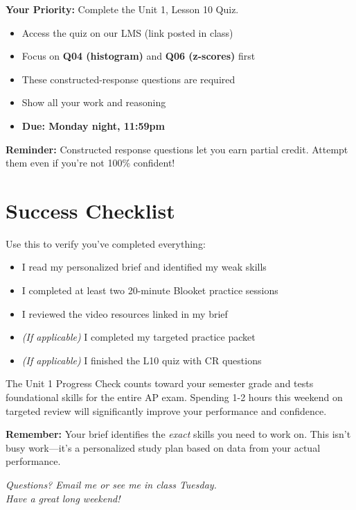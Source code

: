 \documentclass[12pt]{article}
\begin{document}
\begin{tcolorbox}[colback=red!10!white,colframe=red!75!black]
\textbf{Your Priority:} Complete the Unit 1, Lesson 10 Quiz.

\begin{itemize}[leftmargin=*]
    \item Access the quiz on our LMS (link posted in class)
    \item Focus on \textbf{Q04 (histogram)} and \textbf{Q06 (z-scores)} first
    \item These constructed-response questions are required
    \item Show all your work and reasoning
    \item \textbf{Due: Monday night, 11:59pm}
\end{itemize}

\textbf{Reminder:} Constructed response questions let you earn partial credit. Attempt them even if you're not 100\% confident!
\end{tcolorbox}

\vspace{0.2in}

\section*{Success Checklist}

Use this to verify you've completed everything:

\begin{itemize}[label=$\square$,leftmargin=*]
    \item I read my personalized brief and identified my weak skills
    \item I completed at least two 20-minute Blooket practice sessions
    \item I reviewed the video resources linked in my brief
    \item \textit{(If applicable)} I completed my targeted practice packet
    \item \textit{(If applicable)} I finished the L10 quiz with CR questions
\end{itemize}

\vspace{0.2in}

\begin{tcolorbox}[colback=blue!5!white,colframe=blue!75!black,title=\textbf{Why This Matters}]
The Unit 1 Progress Check counts toward your semester grade and tests foundational skills for the entire AP exam. Spending 1-2 hours this weekend on targeted review will significantly improve your performance and confidence.

\textbf{Remember:} Your brief identifies the \textit{exact} skills you need to work on. This isn't busy work---it's a personalized study plan based on data from your actual performance.
\end{tcolorbox}

\vspace{0.2in}

\begin{center}
\textit{Questions? Email me or see me in class Tuesday.}\\
\textit{Have a great long weekend!}
\end{center}
\end{document}
